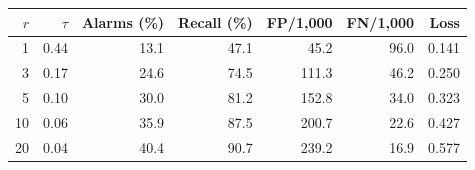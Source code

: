 \begin{tabular}{rrrrrrr}
\toprule
$r$ & $\tau$ & Alarms (\%) & Recall (\%) & FP/1,000 & FN/1,000 & Loss \\
\midrule
1 & 0.44 & 13.1 & 47.1 & 45.2 & 96.0 & 0.141 \\
3 & 0.17 & 24.6 & 74.5 & 111.3 & 46.2 & 0.250 \\
5 & 0.10 & 30.0 & 81.2 & 152.8 & 34.0 & 0.323 \\
10 & 0.06 & 35.9 & 87.5 & 200.7 & 22.6 & 0.427 \\
20 & 0.04 & 40.4 & 90.7 & 239.2 & 16.9 & 0.577 \\
\bottomrule
\end{tabular}
